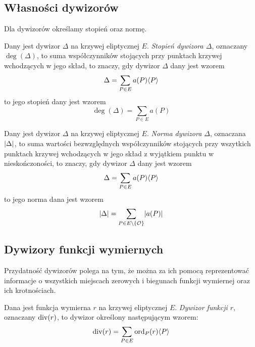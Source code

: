 \subsection*{Własności dywizorów}

Dla dywizorów określamy stopień oraz normę.

\begin{definition}
Dany jest dywizor $\Delta$ na krzywej eliptycznej $E$.
\emph{Stopień dywizora $\Delta$},
oznaczany $\deg(\Delta)$,
to suma współczynników
stojących przy punktach krzywej wchodzących w jego skład,
to znaczy, gdy dywizor $\Delta$ dany jest wzorem
\begin{equation*}
\Delta = \sum_{P \in E} a(P)\langle P\rangle
\end{equation*}
to jego stopień dany jest wzorem
\begin{equation*}
\deg(\Delta) = \sum_{P \in E} a(P)
\end{equation*}
\end{definition}

\begin{definition}
Dany jest dywizor $\Delta$ na krzywej eliptycznej $E$.
\emph{Norma dywizora $\Delta$},
oznaczana $\lvert\Delta\rvert$,
to suma wartości bezwzględnych współczynników
stojących przy wszytkich punktach krzywej wchodzących w jego skład
z wyjątkiem punktu w nieskończoności,
to znaczy, gdy dywizor $\Delta$ dany jest wzorem
\begin{equation*}
\Delta = \sum_{P \in E} a(P)\langle P\rangle
\end{equation*}
to jego norma dana jest wzorem
\begin{equation*}
\lvert\Delta\rvert = \sum_{P \in E \setminus \{\mathcal{O}\}} \lvert a(P)\rvert
\end{equation*}
\end{definition}

\subsection*{Dywizory funkcji wymiernych}

Przydatność dywizorów polega na tym, że można za ich pomocą
reprezentować informacje
o wszystkich miejscach zerowych i biegunach funkcji wymiernej
oraz ich krotnościach.

\begin{definition}
Dana jest funkcja wymierna $r$ na krzywej eliptycznej $E$.
\emph{Dywizor funkcji $r$},
oznaczany $\operatorname{div}(r)$,
to dywizor określony następującym wzorem:
\begin{equation*}
\operatorname{div}(r) = \sum_{P \in E} \operatorname{ord}_P(r)\langle P\rangle
\end{equation*}
\end{definition}

